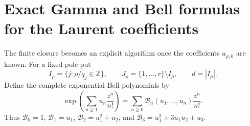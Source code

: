 \section{Exact Gamma and Bell formulas for the Laurent coefficients}
\label{clc:sec:coefficients}

The finite closure becomes an explicit algorithm once the coefficients
$a_{\rho,k}$ are known. For a fixed pole put
\[
 I_\rho=\{j:\rho/q_j\in\mathbb Z\},\qquad
 J_\rho=\{1,\ldots,r\}\setminus I_\rho,
 \qquad d=|I_\rho|.
\]
Define the complete exponential Bell polynomials by
\begin{equation}\label{clc:eq:Bell-def}
 \exp\left(\sum_{n\ge1}u_n\frac{z^n}{n!}\right)
 =\sum_{n\ge0}\mathcal B_n(u_1,\ldots,u_n)\frac{z^n}{n!}.
\end{equation}
Thus $\mathcal B_0=1$, $\mathcal B_1=u_1$,
$\mathcal B_2=u_1^2+u_2$, and
$\mathcal B_3=u_1^3+3u_1u_2+u_3$.

